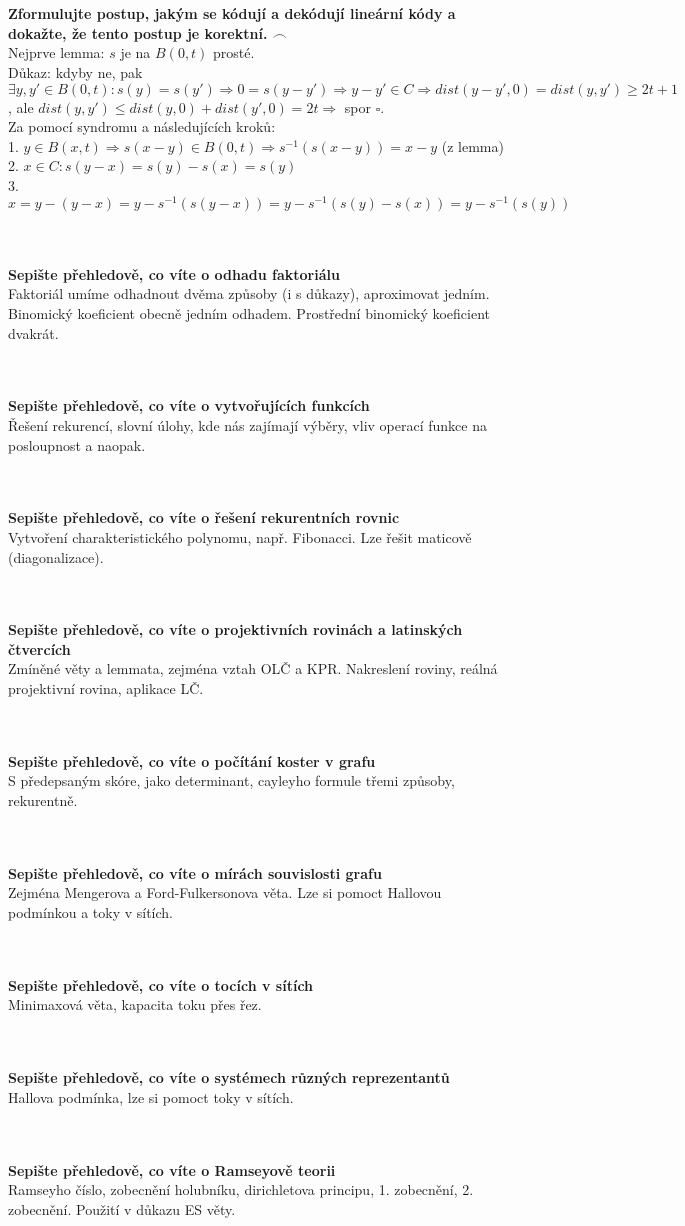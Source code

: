 \documentclass[a4paper]{article}
\newcommand{\fr}{$\frown$}
\newcommand{\led}{\hspace{0.2cm}$\square$}
\newcommand{\hlava}[1]{\text{} \\ \text{} \\ \text{} \hspace{-0.27cm} \textbf{#1} \\}
\begin{document}
\hlava{Zformulujte postup, jakým se kódují a dekódují lineární kódy a dokažte, že tento postup je korektní. \fr}
Nejprve lemma: $s $ je na $B(0,t)$ prosté. \\
Důkaz: kdyby ne, pak $\exists y,y' \in B(0,t): s(y) = s(y') \Rightarrow 0 = s(y-y') \Rightarrow y-y' \in C \Rightarrow dist(y-y', 0) = dist(y, y') \ge 2t+1$, ale $dist(y,y') \le dist(y, 0) + dist(y', 0) = 2t \Rightarrow $ spor \led.\\ 
Za pomocí syndromu a následujících kroků: \\
1. $y \in B(x,t) \Rightarrow s(x-y) \in B(0,t) \Rightarrow s^{-1}(s(x-y)) = x-y $ (z lemma) \\
2. $x\in C: s(y-x) = s(y) - s(x) = s(y)$  \\
3. $x = y-(y-x) = y - s^{-1}(s(y-x)) = y - s^{-1}(s(y)-s(x)) = y - s^{-1}(s(y))$

\pagebreak

\hlava{Sepište přehledově, co víte o odhadu faktoriálu}
Faktoriál umíme odhadnout dvěma způsoby (i s důkazy), aproximovat jedním. Binomický koeficient obecně jedním odhadem. Prostřední binomický koeficient dvakrát.

\hlava{Sepište přehledově, co víte o vytvořujících funkcích}
Řešení rekurencí, slovní úlohy, kde nás zajímají výběry, vliv operací funkce na posloupnost a naopak.

\hlava{Sepište přehledově, co víte o řešení rekurentních rovnic}
Vytvoření charakteristického polynomu, např. Fibonacci. Lze řešit maticově (diagonalizace).

\hlava{Sepište přehledově, co víte o projektivních rovinách a latinských čtvercích}
Zmíněné věty a lemmata, zejména vztah OLČ a KPR. Nakreslení roviny, reálná projektivní rovina, aplikace LČ.

\hlava{Sepište přehledově, co víte o počítání koster v grafu}
S předepsaným skóre, jako determinant, cayleyho formule třemi způsoby, rekurentně.

\hlava{Sepište přehledově, co víte o mírách souvislosti grafu}
Zejména Mengerova a Ford-Fulkersonova věta. Lze si pomoct Hallovou podmínkou a toky v sítích.

\hlava{Sepište přehledově, co víte o tocích v sítích}
Minimaxová věta, kapacita toku přes řez. 

\hlava{Sepište přehledově, co víte o systémech různých reprezentantů}
Hallova podmínka, lze si pomoct toky v sítích.

\hlava{Sepište přehledově, co víte o Ramseyově teorii}
Ramseyho číslo, zobecnění holubníku, dirichletova principu, 1. zobecnění, 2. zobecnění. Použití v důkazu ES věty.
\end{document}
